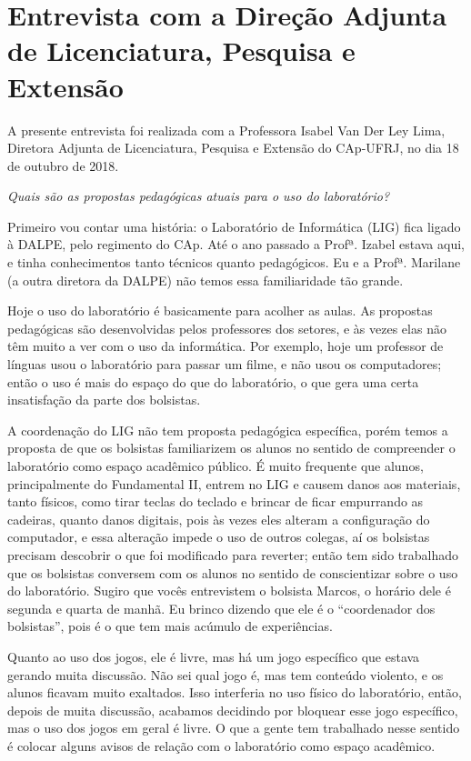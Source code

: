 \section{Entrevista com a Direção Adjunta de Licenciatura, Pesquisa e Extensão}\label{chp:LABEL_CHP_ENT_SEC_DALPE}

A presente entrevista foi realizada com a Professora Isabel Van Der Ley Lima, Diretora Adjunta de Licenciatura, Pesquisa e Extensão do CAp-UFRJ, no dia 18 de outubro de 2018.

\textit{Quais são as propostas pedagógicas atuais para o uso do laboratório?}

Primeiro vou contar uma história: o Laboratório de Informática (LIG) fica ligado à DALPE, pelo regimento do CAp. Até o ano passado a Profª. Izabel estava aqui, e tinha conhecimentos tanto técnicos quanto pedagógicos. Eu e a Profª. Marilane (a outra diretora da DALPE) não temos essa familiaridade tão grande.

Hoje o uso do laboratório é basicamente para acolher as aulas. As propostas pedagógicas são desenvolvidas pelos professores dos setores, e às vezes elas não têm muito a ver com o uso da informática. Por exemplo, hoje um professor de línguas usou o laboratório para passar um filme, e não usou os computadores; então o uso é mais do espaço do que do laboratório, o que gera uma certa insatisfação da parte dos bolsistas.

A coordenação do LIG não tem proposta pedagógica específica, porém temos a proposta de que os bolsistas familiarizem os alunos no sentido de compreender o laboratório como espaço acadêmico público. É muito frequente que alunos, principalmente do Fundamental II, entrem no LIG e causem danos aos materiais, tanto físicos, como tirar teclas do teclado e brincar de ficar empurrando as cadeiras, quanto danos digitais, pois às vezes eles alteram a configuração do computador, e essa alteração impede o uso de outros colegas, aí os bolsistas precisam descobrir o que foi modificado para reverter; então tem sido trabalhado que os bolsistas conversem com os alunos no sentido de conscientizar sobre o uso do laboratório. Sugiro que vocês entrevistem o bolsista Marcos, o horário dele é segunda e quarta de manhã. Eu brinco dizendo que ele é o “coordenador dos bolsistas”, pois é o que tem mais acúmulo de experiências.

Quanto ao uso dos jogos, ele é livre, mas há um jogo específico que estava gerando muita discussão. Não sei qual jogo é, mas tem conteúdo violento, e os alunos ficavam muito exaltados. Isso interferia no uso físico do laboratório, então, depois de muita discussão, acabamos decidindo por bloquear esse jogo específico, mas o uso dos jogos em geral é livre. O que a gente tem trabalhado nesse sentido é colocar alguns avisos de relação com o laboratório como espaço acadêmico.

